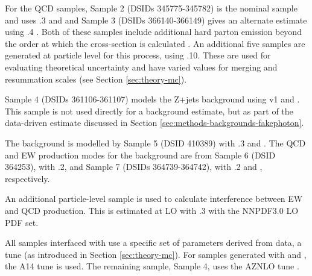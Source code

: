 For the \ac{QCD} \Zy samples, Sample 2 (\acp{DSID} 345775-345782) is the nominal
sample and uses .3 and  and Sample 3
(\acp{DSID} 366140-366149) gives an alternate estimate using .4
\cite{sherpa2dot2}. Both of these samples include additional hard parton emission
beyond the order at which the cross-section is calculated \cite{VBSZy-CONF}. An
additional five samples are generated at particle level for this process, using
.10. These are used for evaluating theoretical uncertainty and have
varied values for merging and resummation scales (see Section
\ref{sec:theory-mc}).

Sample 4 (\acp{DSID} 361106-361107) models the Z+jets background using
\powhegbox v1 \cite{Nason2004,powheg,powhegbox} and 
\cite{pythia8dot1}.  This sample is not used directly for a background estimate,
but as part of the data-driven estimate discussed in Section
\ref{sec:methods-backgrounds-fakephoton}.

The \tty background is modelled by Sample 5 (\ac{DSID} 410389) with
.3 and .  The \ac{QCD} and \ac{EW} production
modes for the \WZjj background are from Sample 6 (\ac{DSID} 364253), with
.2, and Sample 7 (\acp{DSID} 364739-364742), with .2 and , respectively.

An additional particle-level sample is used to calculate interference between
\ac{EW} and \ac{QCD} \Zyjj production. This is estimated at \ac{LO} with
.3 with the NNPDF3.0 \ac{LO} \ac{PDF} set.

All samples interfaced with \pythia use a specific set of parameters derived
from data, a tune (as introduced in Section \ref{sec:theory-mc}). For samples
generated with \madgraph and \pythia, the A14 tune \cite{A14tune} is used. The
remaining \pythia sample, Sample 4, uses
the AZNLO tune \cite{AZNLOtune}.

%
